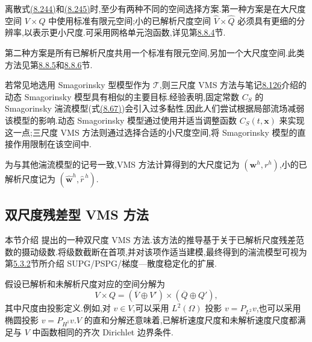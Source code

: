 \begin{note}
\label{note:vms-three-scale-space-choices}
离散式\hyperref[eq:vms-three-scale-model-large]{(8.244)}和\hyperref[eq:vms-three-scale-model-small]{(8.245)}时,至少有两种不同的空间选择方案.第一种方案是在大尺度空间 $V\times Q$ 中使用标准有限元空间;小的已解析尺度空间 $\widehat V\times\widehat Q$ 必须具有更细的分辨率,以表示更小尺度.可采用网格单元泡函数,详见第\hyperref[subsec:vms-bubble-functions]{8.8.4}节.

第二种方案是所有已解析尺度共用一个标准有限元空间,另加一个大尺度空间.此类方法见第\hyperref[subsec:vms-orthogonal-subscales]{8.8.5}和\hyperref[subsec:vms-coarse-space-projection]{8.8.6}节.
\end{note}

\begin{note}
\label{note:vms-dynamic-smagorinsky-common-goal}
若常见地选用 Smagorinsky 型模型作为 $\mathcal{T}$,则三尺度 VMS 方法与笔记\hyperref[note:dynamic-smagorinsky-model]{8.126}介绍的动态 Smagorinsky 模型具有相似的主要目标.经验表明,固定常数 $C_S$ 的 Smagorinsky 湍流模型(式\hyperref[eq:smagorinsky-filter-width]{(8.67)})会引入过多黏性,因此人们尝试根据局部流场减弱该模型的影响.动态 Smagorinsky 模型通过使用并适当调整函数 $C_S(t,\bm{x})$ 来实现这一点;三尺度 VMS 方法则通过选择合适的小尺度空间,将 Smagorinsky 模型的直接作用限制在该空间中.
\end{note}

\begin{note}[记号]
\label{note:vms-notation}
为与其他湍流模型的记号一致,VMS 方法计算得到的大尺度记为 $(\bm{w}^h,r^h)$,小的已解析尺度记为 $(\widehat{\bm{w}}^h,\widehat r^{\,h})$.
\end{note}

\subsection{双尺度残差型 VMS 方法}\label{subsec:vms-residual-based-method}

\begin{note}[内容]
\label{note:vms-residual-method-contents}
本节介绍 \textcite{Bazilevs2007} 提出的一种双尺度 VMS 方法.该方法的推导基于关于已解析尺度残差范数的摄动级数.将级数截断在首项,并对该项作适当建模,最终得到的湍流模型可视为第\hyperref[subsec:oseen-spg-stabilization]{5.3.2}节所介绍 SUPG/PSPG/梯度—散度稳定化的扩展.
\end{note}

\begin{note}[由投影实现尺度分离]
\label{note:vms-projection-scale-separation}
假设已解析和未解析尺度对应的空间分解为
\[
 V\times Q=(\overline V\oplus V')\times(\overline Q\oplus Q'),
\]
其中尺度由投影定义.例如,对 $v\in V$,可以采用 $L^2(\Omega)$ 投影 $v= P_{L^2}v$,也可以采用椭圆投影 $v=P_{H^1}v$.$V$ 的直和分解还意味着,已解析速度尺度和未解析速度尺度都满足与 $V$ 中函数相同的齐次 Dirichlet 边界条件.
\end{note}

